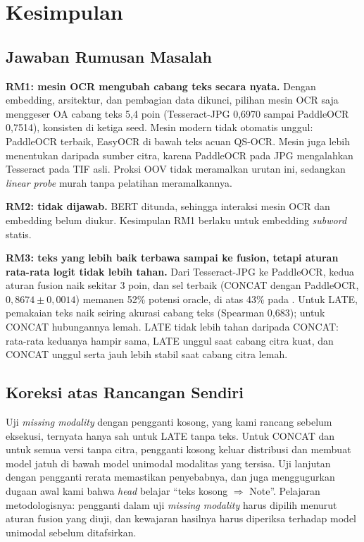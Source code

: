\section{Kesimpulan}\label{sec:kesimpulan}

\subsection{Jawaban Rumusan Masalah}\label{sec:jawaban}

\textbf{RM1: mesin OCR mengubah cabang teks secara nyata.} Dengan embedding, arsitektur,
dan pembagian data dikunci, pilihan mesin OCR saja menggeser OA cabang teks 5,4 poin
(Tesseract-JPG 0,6970 sampai PaddleOCR 0,7514), konsisten di ketiga seed. Mesin modern
tidak otomatis unggul: PaddleOCR terbaik, EasyOCR di bawah teks acuan QS-OCR. Mesin juga
lebih menentukan daripada sumber citra, karena PaddleOCR pada JPG mengalahkan Tesseract
pada TIF asli. Proksi OOV tidak meramalkan urutan ini, sedangkan \textit{linear probe}
murah tanpa pelatihan meramalkannya.

\textbf{RM2: tidak dijawab.} BERT ditunda, sehingga interaksi mesin OCR dan embedding
belum diukur. Kesimpulan RM1 berlaku untuk embedding \textit{subword} statis.

\textbf{RM3: teks yang lebih baik terbawa sampai ke fusion, tetapi aturan rata-rata logit
tidak lebih tahan.} Dari Tesseract-JPG ke PaddleOCR, kedua aturan fusion naik sekitar
3 poin, dan sel terbaik (CONCAT dengan PaddleOCR, $0{,}8674 \pm 0{,}0014$) memanen 52\%
potensi oracle, di atas 43\% pada \textcite{audebert2020}. Untuk LATE, pemakaian teks naik
seiring akurasi cabang teks (Spearman 0,683); untuk CONCAT hubungannya lemah. LATE tidak
lebih tahan daripada CONCAT: rata-rata keduanya hampir sama, LATE unggul saat cabang citra
kuat, dan CONCAT unggul serta jauh lebih stabil saat cabang citra lemah.

\subsection{Koreksi atas Rancangan Sendiri}\label{sec:koreksi}

Uji \textit{missing modality} dengan pengganti kosong, yang kami rancang sebelum
eksekusi, ternyata hanya sah untuk LATE tanpa teks. Untuk CONCAT dan untuk semua versi
tanpa citra, pengganti kosong keluar distribusi dan membuat model jatuh di bawah model
unimodal modalitas yang tersisa. Uji lanjutan dengan pengganti rerata memastikan
penyebabnya, dan juga menggugurkan dugaan awal kami bahwa \textit{head} belajar
\enquote{teks kosong $\Rightarrow$ Note}. Pelajaran metodologisnya: pengganti dalam uji
\textit{missing modality} harus dipilih menurut aturan fusion yang diuji, dan kewajaran
hasilnya harus diperiksa terhadap model unimodal sebelum ditafsirkan.

